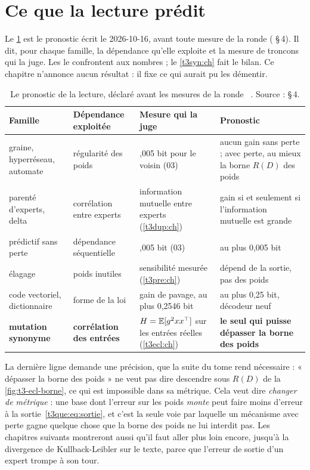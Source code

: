 \section{Ce que la lecture prédit}\label{t3que:sec:prediction}

Le \cref{t3que:tab:pronostic} est le pronostic écrit le 2026-10-16, avant toute mesure de la ronde ( §\,4). Il dit, pour chaque famille, la dépendance qu'elle exploite et la mesure de troncons qui la juge. Les  le confrontent aux nombres ; le \cref{t3syn:ch} fait le bilan. Ce chapitre n'annonce aucun résultat : il fixe ce qui aurait pu les démentir.

\begin{table}[tbp]
\centering\small
\begin{tabularx}{\linewidth}{>{\raggedright\arraybackslash}p{2.6cm} >{\raggedright\arraybackslash}X >{\raggedright\arraybackslash}X >{\raggedright\arraybackslash}X}
\toprule
Famille & Dépendance exploitée & Mesure qui la juge & Pronostic \\
\midrule
graine, hyperréseau, automate & régularité des poids & 0,005 bit pour le voisin (03) & aucun gain sans perte ; avec perte, au mieux la borne $R(D)$ des poids \\
parenté d'experts, delta & corrélation entre experts & information mutuelle entre experts (\cref{t3dup:ch}) & gain si et seulement si l'information mutuelle est grande \\
prédictif sans perte & dépendance séquentielle & 0,005 bit (03) & au plus 0,005 bit \\
élagage & poids inutiles & sensibilité mesurée (\cref{t3pre:ch}) & dépend de la sortie, pas des poids \\
code vectoriel, dictionnaire & forme de la loi & gain de pavage, au plus 0,2546 bit & au plus 0,25 bit, décodeur neuf \\
\textbf{mutation synonyme} & \textbf{corrélation des entrées} & $H = \mathbb{E}[g^2 x x^\top]$ sur les entrées réelles (\cref{t3ecl:ch}) & \textbf{le seul qui puisse dépasser la borne des poids} \\
\bottomrule
\end{tabularx}
\caption[Le pronostic de la lecture]{Le pronostic de la lecture, déclaré avant les mesures de la ronde \calc~\litt. Source :  §\,4.}
\label{t3que:tab:pronostic}
\end{table}

La dernière ligne demande une précision, que la suite du tome rend nécessaire : « dépasser la borne des poids » ne veut pas dire descendre sous $R(D)$ de la \cref{fig:t3-ecl-borne}, ce qui est impossible dans sa métrique. Cela veut dire \emph{changer de métrique} : une base dont l'erreur sur les poids \emph{monte} peut faire moins d'erreur à la sortie~\eqref{t3que:eq:sortie}, et c'est la seule voie par laquelle un mécanisme avec perte gagne quelque chose que la borne des poids ne lui interdit pas. Les chapitres suivants montreront aussi qu'il faut aller plus loin encore, jusqu'à la divergence de Kullback-Leibler sur le texte, parce que l'erreur de sortie d'un expert trompe à son tour.

